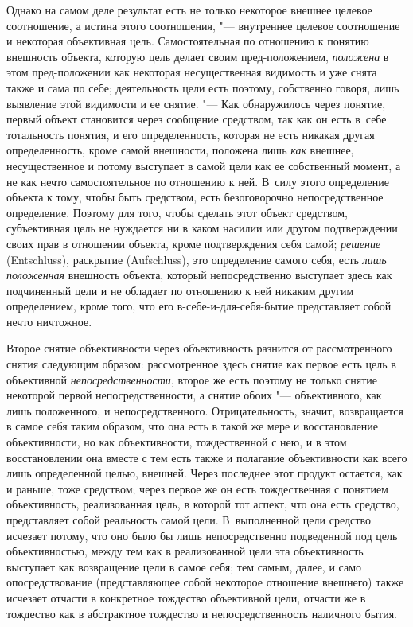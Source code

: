 Однако на самом деле результат есть не только некоторое
внешнее целевое соотношение, а истина этого соотношения, "---
внутреннее целевое соотношение и некоторая объективная цель.
Самостоятельная по отношению к понятию внешность объекта, которую цель
делает своим пред-положением,
{\em положена} в этом
пред-положении как некоторая несущественная видимость и уже
снята также и сама по себе; деятельность цели есть поэтому, собственно
говоря, лишь выявление этой видимости и ее снятие. "--- Как
обнаружилось через понятие, первый объект становится через сообщение
средством, так как он есть в~себе тотальность понятия, и его
определенность, которая не есть никакая другая определенность, кроме самой
внешности, положена лишь {\em как}
внешнее, несущественное и потому выступает в самой цели как
ее собственный момент, а не как нечто самостоятельное по отношению к ней.
В~силу этого определение объекта к тому, чтобы быть средством, есть
безоговорочно непосредственное определение. Поэтому для того, чтобы сделать
этот объект средством, субъективная цель не нуждается ни в каком насилии
или другом подтверждении своих прав в отношении объекта, кроме
подтверждения себя самой; {\em решение}
(Entschluss), раскрытие (Aufschluss), это
определение самого себя, есть {\em лишь
положенная} внешность объекта, который непосредственно
выступает здесь как подчиненный цели и не обладает по отношению к ней
никаким другим определением, кроме того, что его
в-себе-и-для-себя-бытие представляет собой нечто ничтожное.

Второе снятие объективности через объективность разнится от
рассмотренного снятия следующим образом: рассмотренное здесь снятие как
первое есть цель в объективной
{\em непосредственности},
второе же есть поэтому не только снятие некоторой первой
непосредственности, а снятие обоих "--- объективного, как лишь
положенного, и непосредственного. Отрицательность, значит, возвращается в
самое себя таким образом, что она есть в такой же мере и восстановление
объективности, но как объективности, тождественной с нею, и в этом
восстановлении она вместе с тем есть также и полагание объективности как
всего лишь определенной целью, внешней. Через последнее этот продукт
остается, как и раньше, тоже средством; через первое же он есть
тождественная с понятием объективность, реализованная цель, в которой тот
аспект, что она есть средство, представляет собой реальность самой цели.
В~выполненной цели средство исчезает потому, что оно было бы лишь
непосредственно подведенной под цель объективностью, между тем как в
реализованной цели эта объективность выступает как возвращение цели в самое
себя; тем самым, далее, и само опосредствование (представляющее собой
некоторое отношение внешнего) также исчезает отчасти в конкретное тождество
объективной цели, отчасти же в тождество как в абстрактное тождество и
непосредственность наличного бытия.

